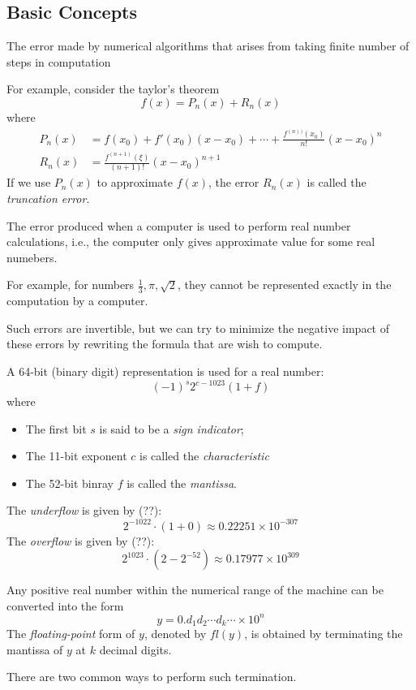 \subsection{Basic Concepts}
\begin{definition}
The error made by numerical algorithms that arises from taking finite number of steps in computation
\end{definition}
For example, consider the taylor's theorem
\[
f(x)=P_n(x)+R_n(x)
\]
where
\begin{align*}
P_n(x)&=f(x_0)+f'(x_0)(x-x_0)+\cdots+\frac{f^{(n))}(x_0)}{n!}(x-x_0)^n\\
R_n(x)&=\frac{f^{(n+1)}(\xi)}{(n+1)!}(x-x_0)^{n+1}
\end{align*}
If we use $P_n(x)$ to approximate $f(x)$, the error $R_n(x)$ is called the \emph{truncation error}.

\begin{definition}
The error produced when a computer is used to
perform real number calculations, i.e., the computer only gives approximate value for some real numebers.
\end{definition}

For example, for numbers $\frac{1}{3},\pi,\sqrt{2}$, they cannot be represented exactly in the computation by a computer.

Such errors are invertible, but  we can try to minimize the negative impact of these errors by rewriting the formula that are wish to compute.

\begin{definition}
A 64-bit (binary digit) representation is used for a real number:
\[
(-1)^s2^{c-1023}(1+f)
\]
where 
\begin{itemize}
\item
The first bit $s$ is said to be a \emph{sign indicator};
\item
The 11-bit exponent $c$ is called the \emph{characteristic}
\item
The 52-bit binray $f$ is called the \emph{mantissa}.
\end{itemize}
\end{definition}
The \emph{underflow} is given by (??):
\[
2^{-1022}\cdot(1+0)\approx 0.22251\times 10^{-307}
\]
The \emph{overflow} is given by (??):
\[
2^{1023}\cdot(2-2^{-52})\approx 0.17977\times 10^{309}
\]
\begin{definition}
Any positive real number within the numerical range of the machine can be converted into the form
\[
y = 0.d_1d_2\cdots d_k\cdots\times10^n
\]
The \emph{floating-point} form of $y$, denoted by $fl(y)$, is obtained by terminating the mantissa of $y$ at $k$ decimal digits.
\end{definition}
There are two common ways to perform such termination.
